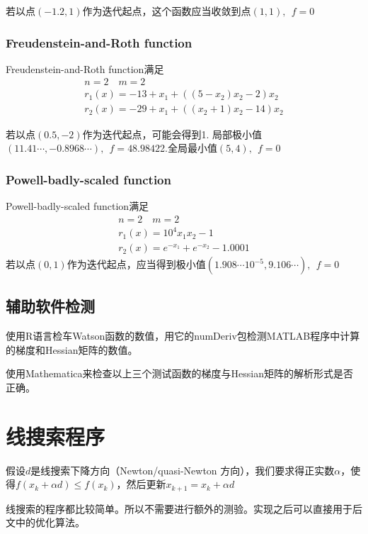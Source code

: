 \documentclass[11pt, a4paper]{article}
\begin{document}
若以点$(-1.2, 1)$作为迭代起点，这个函数应当收敛到点$(1, 1),~~f=0$
\subsubsection{Freudenstein-and-Roth function}
Freudenstein-and-Roth function\cite{freudenstein1963numerical}满足
\begin{equation*}
\begin{array}{c}
n=2\quad m=2\\
r_1(x)=-13+x_1+((5-x_2)x_2-2)x_2\\
r_2(x)=-29+x_1+((x_2+1)x_2-14)x_2
\end{array}
\end{equation*}

若以点$(0.5,-2)$作为迭代起点，可能会得到1. 局部极小值$(11.41\cdots,-0.8968\cdots),~~f=48.9842$\quad 2.全局最小值$(5,4),~~f=0$
\subsubsection{Powell-badly-scaled function}
Powell-badly-scaled function\cite{Powell1970}满足
\begin{equation*}
\begin{array}{c}
n=2\quad m=2\\
r_1(x)=10^4x_1x_2-1\\
r_2(x)=e^{-x_1}+e^{-x_2}-1.0001
\end{array}
\end{equation*}
若以点$(0,1)$作为迭代起点，应当得到极小值$(1.908\cdots 10^{-5},9.106\cdots),~~f=0$

\subsection{辅助软件检测} 

使用R语言检车Watson函数的数值，用它的numDeriv包检测MATLAB程序中计算的梯度和Hessian矩阵的数值。

使用Mathematica来检查以上三个测试函数的梯度与Hessian矩阵的解析形式是否正确。

\section{线搜索程序}

假设$d$是线搜索下降方向（Newton/quasi-Newton 方向），我们要求得正实数$\alpha$，使得$f(x_k+\alpha d)\le f(x_k)$，然后更新$x_{k+1}=x_k+\alpha d$

线搜索的程序都比较简单。所以不需要进行额外的测验。实现之后可以直接用于后文中的优化算法。
\end{document}
